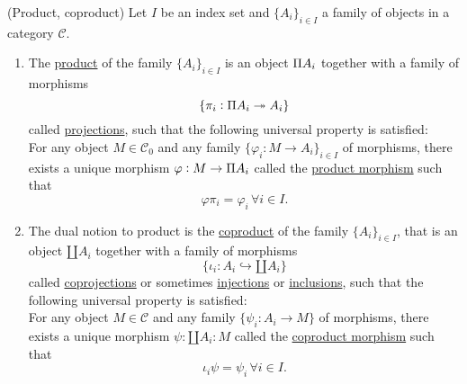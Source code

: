 \begin{definition}{(Product, coproduct)}\label{def:prod_coprod}
Let $I$ be an index set and $\{A_{i}\}_{i\in I}$ a family of objects in a category $\mathcal{C}$.
\begin{enumerate}
\renewcommand{\labelenumi}{(prod)}
\item The \ul{product} of the family $\{A_{i}\}_{i\in I}$ is an object $\invamalg A_{i}$ together with a family of morphisms
\[
\{ \pi_{i} : \invamalg A_{i} \twoheadrightarrow A_{i} \}
\]
called \ul{projections}, such that the following universal property is satisfied:\\
For any object $M \in \mathcal{C}_{0}$ and any family $\{ \varphi_{i} : M \rightarrow A_{i} \}_{i\in I}$ of morphisms, there exists
a unique morphism $\varphi : M \rightarrow \invamalg A_{i}$ called the \ul{product morphism} such that
\[
\varphi \pi_{i} = \varphi_{i} \, \forall i \in I.
\]
\renewcommand{\labelenumi}{(coprod)}
\item The dual notion to product is the \ul{coproduct} of the family $\{A_{i}\}_{i\in I}$, that is an object $\amalg A_{i}$ together with
a family of morphisms
\[
\{ \iota_{i} : A_{i} \hookrightarrow \amalg A_{i} \}
\]
called \ul{coprojections} or sometimes \ul{injections} or \ul{inclusions}, such that the following universal property is satisfied:\\
For any object $M \in \mathcal{C}$ and any family $\{ \psi_{i} : A_{i} \rightarrow M \}$ of morphisms, there exists a unique
morphism $\psi : \amalg A_{i} : M$ called the \ul{coproduct morphism} such that
\[
\iota_{i} \psi = \psi_{i} \, \forall i \in I.
\]
\end{enumerate}
\end{definition}

